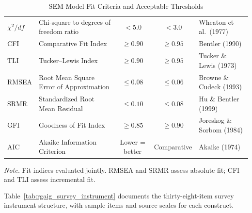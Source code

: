 \begingroup\singlespacing\tablefontsize\tablestripes
\begin{xltabular}{\textwidth}{@{} l X c c l @{}}
\caption{SEM Model Fit Criteria and Acceptable Thresholds}
\label{tab:rgaig_sem_fit_criteria}\\
\toprule
{} &  &  &  &  \\
\midrule
\endfirsthead
\endhead
\bottomrule
\endlastfoot
$\chi^2/df$ & Chi-square to degrees of freedom ratio & $< 5.0$ & $< 3.0$ & Wheaton et al.\ (1977) \\
\addlinespace
CFI & Comparative Fit Index & $\geq 0.90$ & $\geq 0.95$ & Bentler (1990) \\
\addlinespace
TLI & Tucker--Lewis Index & $\geq 0.90$ & $\geq 0.95$ & Tucker \& Lewis (1973) \\
\addlinespace
RMSEA & Root Mean Square Error of Approximation & $\leq 0.08$ & $\leq 0.06$ & Browne \& Cudeck (1993) \\
\addlinespace
SRMR & Standardized Root Mean Residual & $\leq 0.10$ & $\leq 0.08$ & Hu \& Bentler (1999) \\
\addlinespace
GFI & Goodness of Fit Index & $\geq 0.85$ & $\geq 0.90$ & Joreskog \& Sorbom (1984) \\
\addlinespace
AIC & Akaike Information Criterion & Lower = better & Comparative & Akaike (1974) \\
\end{xltabular}
\par\smallskip\noindent\textit{Note.} Fit indices evaluated jointly. RMSEA and SRMR assess absolute fit; CFI and TLI assess incremental fit.
\endgroup

Table~\ref{tab:rgaig_survey_instrument} documents the thirty-eight-item survey instrument structure, with sample items and source scales for each construct.

